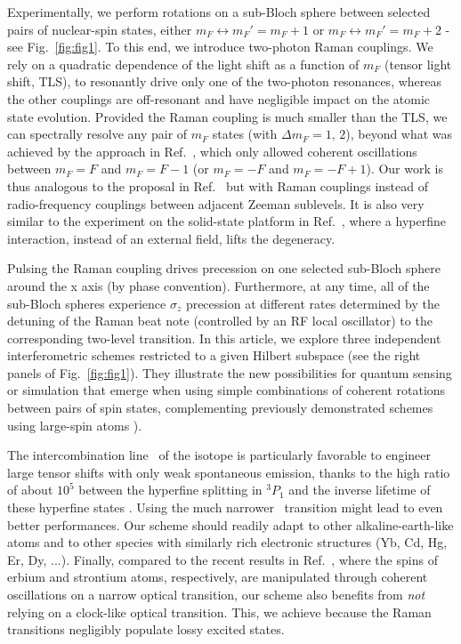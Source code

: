 Experimentally, we perform rotations on a sub-Bloch sphere between selected pairs of nuclear-spin states, either $m_F \longleftrightarrow m_F' = m_F+1$ or $m_F \longleftrightarrow m_F' = m_F+2$ - see Fig.~\ref{fig:fig1}. To this end, we introduce two-photon Raman couplings. We rely on a quadratic dependence of the light shift as a function of $m_F$ (tensor light shift, TLS), to resonantly drive only one of the two-photon resonances, whereas the other couplings are off-resonant and have negligible impact on the atomic state evolution. 
Provided the Raman coupling is much smaller than the TLS, we can spectrally resolve any pair of $m_F$ states (with $\Delta m_F = 1,\,2$), beyond what was achieved by the approach in Ref.~\cite{Barnes2022}, which only allowed coherent oscillations between $m_F = F$ and $m_F = F-1$ (or $m_F = -F$ and $m_F = -F+1$).
Our work is thus analogous to the proposal in Ref.~\cite{Omanakuttan2021} but with Raman couplings instead of radio-frequency couplings between adjacent Zeeman sublevels. It is also very similar to the experiment on the solid-state platform in Ref.~\cite{Godfrin2018gri}, where a hyperfine interaction, instead of an external field, lifts the degeneracy.  

Pulsing the Raman coupling drives precession on one selected sub-Bloch sphere around the x axis (by phase convention). Furthermore, at any time, all of the sub-Bloch spheres experience $\sigma_z$ precession at different rates determined by the detuning of the Raman beat note (controlled by an RF local oscillator) to the corresponding two-level transition. In this article, we explore three independent interferometric schemes restricted to a given Hilbert subspace (see the right panels of Fig.~\ref{fig:fig1}). They illustrate the new possibilities for quantum sensing or simulation that emerge when using simple combinations of coherent rotations between pairs of spin states, complementing previously demonstrated schemes using large-spin atoms \cite{Fernholz2008sso, Chalopin2018qes, Evrard2019ems}).

The intercombination line \RedMotTransition~of the  isotope is particularly favorable to engineer large tensor shifts with only weak spontaneous emission, thanks to the high ratio of about $10^5$ between the hyperfine splitting in $^3P_1$ and the inverse lifetime of these hyperfine states \cite{Burba2024}. Using the much narrower \ThreePTwoTransition~transition might lead to even better performances. Our scheme should readily adapt to other alkaline-earth-like atoms and to other species with similarly rich electronic structures (Yb, Cd, Hg, Er, Dy, ...). Finally, compared to the recent results in Ref.~\cite{claude2024, Zheng2024}, where the spins of erbium and strontium atoms, respectively, are manipulated through coherent oscillations on a narrow optical transition, our scheme also benefits from \textit{not} relying on a clock-like optical transition. This, we achieve because the Raman transitions negligibly populate lossy excited states.


